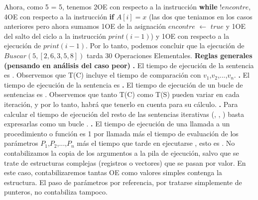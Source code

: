 \documentclass[10pt,a4paper]{article}
\begin{document}
Ahora, como 5 = 5, tenemos 2OE con respecto a la instrucción \textbf{while} $!encontre$, 4OE con respecto a la instrucción \textbf{if} $A[i] = x$ (las dos que teniamos en los casos anteriores pero ahora sumamos 1OE de la asignación $encontre$ $\gets$ $true$ y 1OE del salto del ciclo a la instrucción $print(i-1)$) y 1OE con respecto a la ejecución de $print(i-1)$.
\newline
\newline
Por lo tanto, podemos concluir que la ejecución de  $Buscar(5, [2,6,3,5,8])$ tarda 30 Operaciones Elementales. 
\newline
\newline
\textbf{Reglas generales (pensando en análisis del caso peor)}
\newline
\newline
\textbf{.} El tiempo de ejecución de la sentencia  es . Observemos que T(C) incluye el tiempo de comparación con $v_{1}$,$v_{2}$,...,$v_{n}$.
\newline
\newline
\textbf{.} El tiempo de ejecución de la sentencia  es 
\newline
\newline
\textbf{.} El tiempo de ejecución de un bucle de sentencias  es . Observemos que tanto T(C) como T(S) pueden variar en cada iteración, y por lo tanto, habrá que tenerlo en cuenta para su cálculo.   
\newline
\newline
\textbf{.} Para calcular el tiempo de ejecución del resto de las sentencias iterativas (, , ) basta expresarlas como un bucle .
\newline
\newline
\textbf{.} El tiempo de ejecución de una llamada a un procedimiento o función  es 1 por llamada más el tiempo de evaluación de los parámetros $P_{1}$,$P_{2}$,...,$P_{n}$ más el tiempo que tarde en ejecutarse , esto es . No contabilizamos la copia de los argumentos a la pila de ejecución, salvo que se trate de estructuras complejas (registros o vectores) que se pasan por valor. En este caso, contabilizaremos tantas OE como valores simples contenga la estructura. El paso de parámetros por referencia, por tratarse simplemente de punteros, no contabiliza tampoco. 
\end{document}
